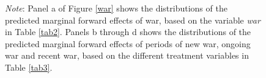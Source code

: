 \documentclass [12pt] {article}
\renewcommand{\footnotesize}{\scriptsize} %
\begin{document}
\begin{figure}[h]
  \begin{flushleft}  
        {\footnotesize {\it Note}: Panel a of Figure \ref{war} shows the distributions of the predicted marginal forward effects of war, based on the variable {\it war} %
  in Table \ref{tab2}. Panels b through d  shows the distributions of the predicted marginal forward effects of periods of new war, ongoing war and recent war, based on the different treatment variables %
  in Table \ref{tab3}. }
       \end{flushleft} 
\end{figure}
\end{document}

